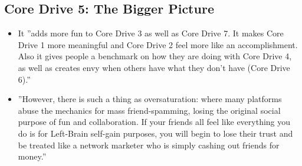 \subsection{Core Drive 5: The Bigger Picture}
\begin{itemize}
    \item It ''adds more fun to Core Drive 3 as well as Core Drive 7. It makes Core Drive 1 more meaningful and Core Drive 2 feel more like an accomplishment. Also it gives people a benchmark on how they are doing with Core Drive 4, as well as creates envy when others have what they don't have (Core Drive 6).''
    \item ''However, there is such a thing as oversaturation: where many platforms abuse the mechanics for mass friend-spamming, losing the original social purpose of fun and collaboration. If your friends all feel like everything you do is for Left-Brain self-gain purposes, you will begin to lose their trust and be treated like a network marketer who is simply cashing out friends for money.''
\end{itemize}
